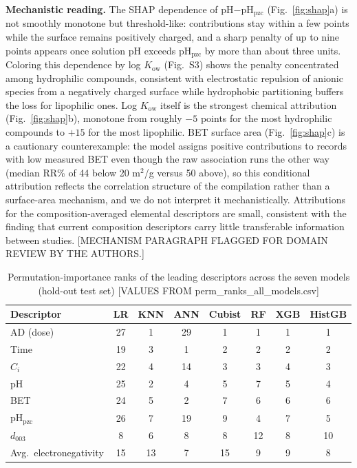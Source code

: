 \textbf{Mechanistic reading.} The SHAP dependence of
pH$-$pH$_{\mathrm{pzc}}$ (Fig.~\ref{fig:shap}a) is not smoothly
monotone but threshold-like: contributions stay within a few points
while the surface remains positively charged, and a sharp penalty of up
to nine points appears once solution pH exceeds pH$_{\mathrm{pzc}}$ by
more than about three units. Coloring this dependence by log
$K_{\mathrm{ow}}$ (Fig.~S3) shows the penalty concentrated among
hydrophilic compounds, consistent with electrostatic repulsion of
anionic species from a negatively charged surface while hydrophobic
partitioning buffers the loss for lipophilic ones. Log
$K_{\mathrm{ow}}$ itself is the strongest chemical attribution
(Fig.~\ref{fig:shap}b), monotone from roughly $-5$ points for the most
hydrophilic compounds to $+15$ for the most lipophilic. BET surface
area (Fig.~\ref{fig:shap}c) is a cautionary counterexample: the model
assigns positive contributions to records with low measured BET even
though the raw association runs the other way (median RR\% of 44 below
20 m$^2$/g versus 50 above), so this conditional attribution reflects
the correlation structure of the compilation rather than a
surface-area mechanism, and we do not interpret it mechanistically.
Attributions for the composition-averaged elemental descriptors are
small, consistent with the finding that current composition descriptors
carry little transferable information between studies. [MECHANISM
PARAGRAPH FLAGGED FOR DOMAIN REVIEW BY THE AUTHORS.]

\begin{table}[t]
\centering
\caption{Permutation-importance ranks of the leading descriptors across
the seven models (hold-out test set)
[VALUES FROM perm\_ranks\_all\_models.csv]}
\label{tab:ranks}
\begin{tabular}{lccccccc}
\toprule
Descriptor & LR & KNN & ANN & Cubist & RF & XGB & HistGB \\
\midrule
AD (dose)            & 27 & 1 & 29 & 1 & 1 & 1 & 1 \\
Time                 & 19 & 3 & 1  & 2 & 2 & 2 & 2 \\
$C_i$                & 22 & 4 & 14 & 3 & 3 & 4 & 3 \\
pH                   & 25 & 2 & 4  & 5 & 7 & 5 & 4 \\
BET                  & 24 & 5 & 2  & 7 & 6 & 6 & 6 \\
pH$_{\mathrm{pzc}}$  & 26 & 7 & 19 & 9 & 4 & 7 & 5 \\
$d_{003}$            & 8  & 6 & 8  & 8 & 12 & 8 & 10 \\
Avg.\ electronegativity & 15 & 13 & 7 & 15 & 9 & 9 & 8 \\
\bottomrule
\end{tabular}
\end{table}

